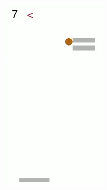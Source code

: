 \begin{figure}[h]
\begin{subfigure}[b]{0.23\textwidth}
		\includegraphics[width=\textwidth]{images/breakout-33-lr-2.png}
	\end{subfigure}
	\begin{subfigure}[b]{0.23\textwidth}

\end{subfigure}
\end{figure}
